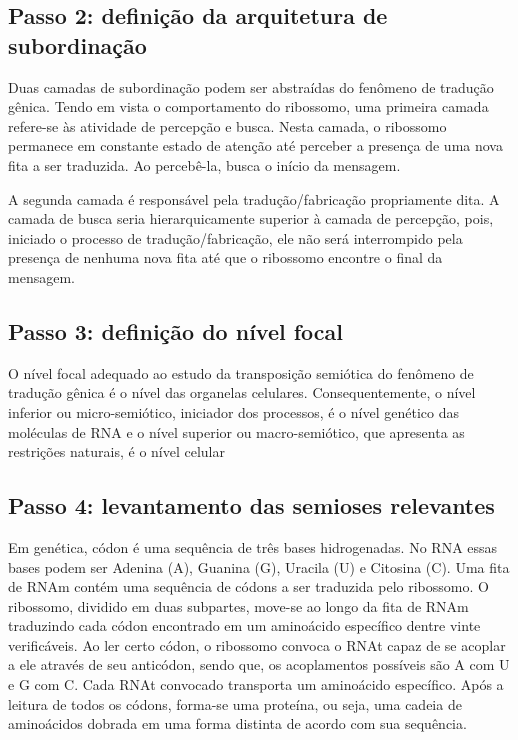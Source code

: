 \subsection{Passo 2: definição da arquitetura de subordinação}

Duas camadas de subordinação podem ser abstraídas do fenômeno de tradução gênica. Tendo em vista o comportamento do ribossomo, uma primeira camada refere-se às atividade de percepção e busca. Nesta camada, o ribossomo permanece em constante estado de atenção até perceber a presença de uma nova fita a ser traduzida. Ao percebê-la, busca o início da mensagem.

A segunda camada é responsável pela tradução/fabricação propriamente dita. A camada de busca seria hierarquicamente superior à camada de percepção, pois, iniciado o processo de tradução/fabricação, ele não será interrompido pela presença de nenhuma nova fita até que o ribossomo encontre o final da mensagem. %


\subsection{Passo 3: definição do nível focal}

O nível focal adequado ao estudo da transposição semiótica do fenômeno de tradução gênica é o nível das organelas celulares. Consequentemente, o nível inferior ou micro-semiótico, iniciador dos processos, é o nível genético das moléculas de RNA e o nível superior ou macro-semiótico, que apresenta as restrições naturais, é o nível celular %


\subsection{Passo 4: levantamento das semioses relevantes}

Em genética, códon é uma sequência de três bases hidrogenadas. No RNA essas bases podem ser Adenina (A), Guanina (G), Uracila (U) e Citosina (C). Uma fita de RNAm contém uma sequência de códons a ser traduzida pelo ribossomo. O ribossomo, dividido em duas subpartes, move-se ao longo da fita de RNAm traduzindo cada códon encontrado em um aminoácido específico dentre vinte verificáveis. Ao ler certo códon, o ribossomo convoca o RNAt capaz de se acoplar a ele através de seu anticódon, sendo que, os acoplamentos possíveis são A com U e G com C. Cada RNAt convocado transporta um aminoácido específico. Após a leitura de todos os códons, forma-se uma proteína, ou seja, uma cadeia de aminoácidos dobrada em uma forma distinta de acordo com sua sequência.


